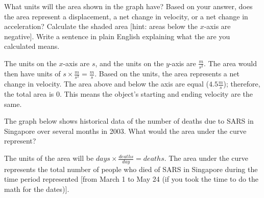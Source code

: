 \begin{Exercise}[label=units1]
What units will the area shown in the graph have? Based on your answer, does the area represent a displacement, a net change in velocity, or a net change in acceleration? Calculate the shaded area [hint: areas below the $x$-axis are negative]. Write a sentence in plain English explaining what the are you calculated means.\\
\end{Exercise}

\begin{Answer}[ref=units1]
The units on the $x$-axis are $s$, and the units on the $y$-axis are $\frac{m}{s^2}$. The area would then have units of $s \times \frac{m}{s^2}=\frac{m}{s}$. Based on the units, the area represents a net change in velocity. The area above and below the axis are equal ($4.5 \frac{m}{s}$); therefore, the total area is $0$. This means the object's starting and ending velocity are the same. 
\end{Answer}

\begin{Exercise}[label=units2]
	The graph below shows historical data of the number of deaths due to SARS in Singapore over several months in 2003. What would the area under the curve represent?\\
	
\end{Exercise}

\begin{Answer}[ref=units2]
	The units of the area will be $days \times \frac{deaths}{day}=deaths$. The area under the curve represents the total number of people who died of SARS in Singapore during the time period represented [from March 1 to May 24 (if you took the time to do the math for the dates)]. 
\end{Answer}

